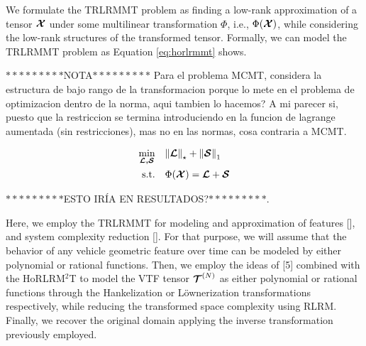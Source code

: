 \documentclass[sensors,article,submit,moreauthors,pdftex]{Definitions/mdpi}
\newcommand{\mathten}[1]{\boldsymbol{\mathbf{\mathcal{\MakeUppercase{#1}}}}}
\begin{document}
We formulate the TRLRMMT problem as finding a low-rank approximation of a tensor $\mathten{X}$ 
under some multilinear transformation $\Phi$, i.e., $\Phi(\mathten{X})$, while considering the low-rank structures of the transformed tensor. Formally, we can model the TRLRMMT problem as Equation \ref{eq:horlrmmt} shows. 

$*********$NOTA$*********$ Para el problema MCMT, considera la estructura de bajo rango de la transformacion porque lo mete en el problema de optimizacion dentro de la norma, aqui tambien lo hacemos? A mi parecer si, puesto que la restriccion se termina introduciendo en la funcion de lagrange aumentada (sin restricciones), mas no en las normas, cosa contraria a MCMT.


\begin{equation}
	\begin{aligned}
		\min_{\mathten{L,S}} \quad & {\left\lVert \mathten{L} \right\rVert_\star + \left\lVert\mathten{S}\right\rVert_1}\\
		\textrm{s.t.} \quad & \Phi(\mathten{X}) = \mathten{L} + \mathten{S}
	\end{aligned}
\label{eq:horlrmmt}
\end{equation}


$*********$ESTO IRÍA EN RESULTADOS?$*********$.

Here, we employ the TRLRMMT for modeling and approximation of features [], and system complexity reduction []. For that purpose, we will assume that the behavior of any vehicle geometric feature over time can be modeled by either polynomial or rational functions. Then, we employ the ideas of [5] combined with the HoRLRM$^2$T to model the VTF tensor $\mathten{T}^{(N)}$ as either polynomial or rational functions through the Hankelization or L{\"o}wnerization transformations respectively, while reducing the transformed space complexity using RLRM. Finally, we recover the original domain applying the inverse transformation previously employed.





\end{document}
